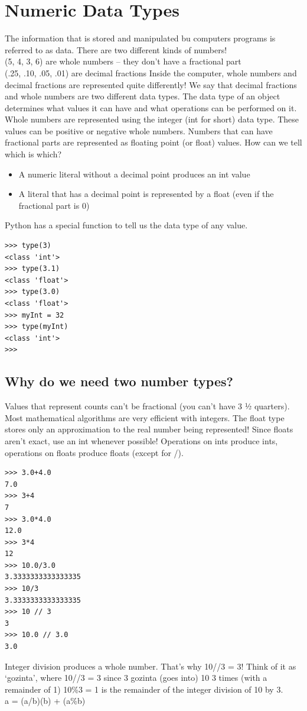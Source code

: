 \documentclass[12pt,a4paper,final,twoside,titlepage]{book}
\begin{document}
\section{Numeric Data Types}
The information that is stored and manipulated bu computers programs is referred to as data. There are two different kinds of numbers!
\\(5, 4, 3, 6) are whole numbers – they don’t have a fractional part
\\(.25, .10, .05, .01) are decimal fractions
Inside the computer, whole numbers and decimal fractions are represented quite differently! We say that decimal fractions and whole numbers are two different data types. The data type of an object determines what values it can have and what operations can be performed on it. Whole numbers are represented using the integer (int for short) data type. These values can be positive or negative whole numbers. Numbers that can have fractional parts are represented as floating point (or float) values.
How can we tell which is which?
\begin{itemize}
\item A numeric literal without a decimal point produces an int value
\item A literal that has a decimal point is represented by a float (even if the fractional part is 0)
\end{itemize}
Python has a special function to tell us the data type of any value.
\lstset{language=Python, tabsize=4}
\begin{lstlisting}
>>> type(3)
<class 'int'>
>>> type(3.1)
<class 'float'>
>>> type(3.0)
<class 'float'>
>>> myInt = 32
>>> type(myInt)
<class 'int'>
>>> 
\end{lstlisting}
\subsection{Why do we need two number types?}
Values that represent counts can’t be fractional (you can’t have 3 ½ quarters). Most mathematical algorithms are very efficient with integers. The float type stores only an approximation to the real number being represented! Since floats aren’t exact, use an int whenever possible! Operations on ints produce ints, operations on floats produce floats (except for /).
\lstset{language=Python, tabsize=4}
\begin{lstlisting}
>>> 3.0+4.0
7.0
>>> 3+4
7
>>> 3.0*4.0
12.0
>>> 3*4
12
>>> 10.0/3.0
3.3333333333333335
>>> 10/3
3.3333333333333335
>>> 10 // 3
3
>>> 10.0 // 3.0
3.0
\end{lstlisting}
Integer division produces a whole number. That’s why 10//3 = 3!
Think of it as ‘gozinta’, where 10//3 = 3 since 3 gozinta (goes into) 10 3 times (with a remainder of 1)
10\%3 = 1 is the remainder of the integer division of 10 by 3.
\\a = (a/b)(b) + (a\%b)
\end{document}
